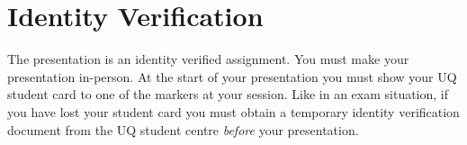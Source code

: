 \documentclass{csse4400}
\begin{document}
\section{Identity Verification}
The presentation is an identity verified assignment.
You must make your presentation in-person.
At the start of your presentation you must show your UQ student card to one of the markers at your session.
Like in an exam situation, if you have lost your student card
you must obtain a temporary identity verification document from the UQ student centre \emph{before} your presentation.


%
%
\end{document}
